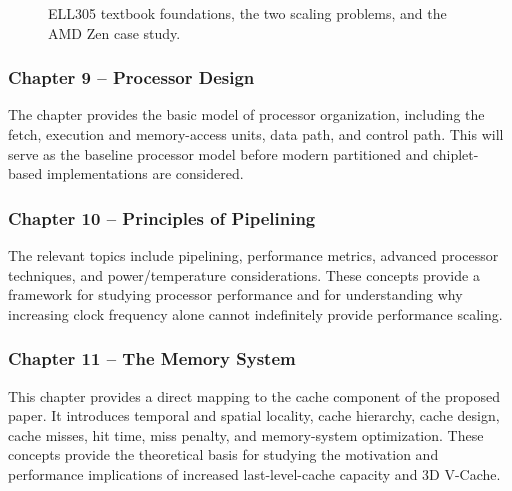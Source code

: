 \documentclass[12pt,a4paper,twoside]{article}
\begin{document}
\begin{figure}[!t]
  \caption{ELL305 textbook foundations, the two scaling problems, and the AMD Zen case study.}
  \label{fig:textbook-topic-map}
\end{figure}

\subsubsection{Chapter 9 -- Processor Design}

The chapter provides the basic model of processor organization, including the fetch, execution and memory-access units, data path, and control path. This will serve as the baseline processor model before modern partitioned and chiplet-based implementations are considered.

\subsubsection{Chapter 10 -- Principles of Pipelining}

The relevant topics include pipelining, performance metrics, advanced processor techniques, and power/temperature considerations. These concepts provide a framework for studying processor performance and for understanding why increasing clock frequency alone cannot indefinitely provide performance scaling.

\subsubsection{Chapter 11 -- The Memory System}

This chapter provides a direct mapping to the cache component of the proposed paper. It introduces temporal and spatial locality, cache hierarchy, cache design, cache misses, hit time, miss penalty, and memory-system optimization. These concepts provide the theoretical basis for studying the motivation and performance implications of increased last-level-cache capacity and 3D V-Cache.
\end{document}
